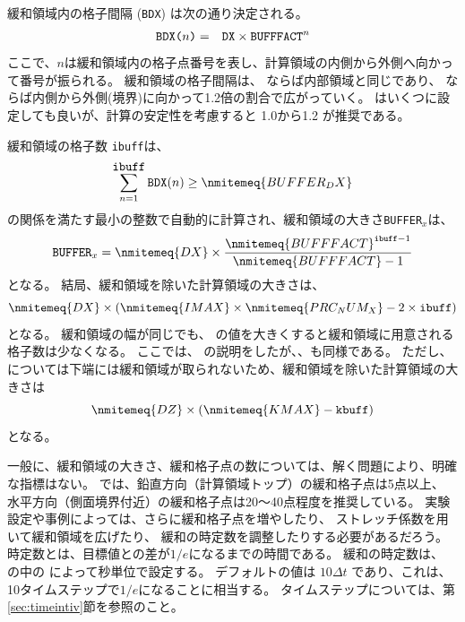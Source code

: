 緩和領域内の格子間隔 (\verb|BDX|) は次の通り決定される。
\begin{eqnarray}
 \verb|BDX(|n\verb|)| &=& \verb|DX| \times \verb|BUFFFACT|^n \nonumber
\end{eqnarray}
ここで、$n$は緩和領域内の格子点番号を表し、計算領域の内側から外側へ向かって番号が振られる。
緩和領域の格子間隔は、
ならば内部領域と同じであり、
ならば内側から外側(境界)に向かって1.2倍の割合で広がっていく。
はいくつに設定しても良いが、計算の安定性を考慮すると 1.0から1.2 が推奨である。

緩和領域の格子数 \verb|ibuff|は、
\begin{eqnarray}
\sum_{n=1}^{\verb|ibuff|} \verb|BDX|(n) \ge \nmitemeq{BUFFER_DX} \nonumber
\end{eqnarray}
の関係を満たす最小の整数で自動的に計算され、緩和領域の大きさ\verb|BUFFER|$_x$は、
\[
  \verb|BUFFER|_x = \nmitemeq{DX} \times \frac{ \nmitemeq{BUFFFACT}^{\texttt{\detokenize{ibuff}}-1 }}{ \nmitemeq{BUFFFACT}-1 }
\]
となる。
結局、緩和領域を除いた計算領域の大きさは、
\[
\nmitemeq{DX} \times ( \nmitemeq{IMAX} \times \nmitemeq{PRC_NUM_X} - 2 \times \verb|ibuff| )
\]
となる。
%
緩和領域の幅が同じでも、
の値を大きくすると緩和領域に用意される格子数は少なくなる。
ここでは、{\XDIR} の説明をしたが、{\YDIR}、{\ZDIR}も同様である。
ただし、{\ZDIR} については下端には緩和領域が取られないため、緩和領域を除いた計算領域の大きさは
\[
\nmitemeq{DZ} \times ( \nmitemeq{KMAX} - \verb|kbuff| )
\]
となる。



一般に、緩和領域の大きさ、緩和格子点の数については、解く問題により、明確な指標はない。
\scalerm では、鉛直方向（計算領域トップ）の緩和格子点は5点以上、
水平方向（側面境界付近）の緩和格子点は20〜40点程度を推奨している。
実験設定や事例によっては、さらに緩和格子点を増やしたり、
ストレッチ係数を用いて緩和領域を広げたり、
緩和の時定数を調整したりする必要があるだろう。
時定数とは、目標値との差が$1/e$になるまでの時間である。
緩和の時定数は、
の中の
によって秒単位で設定する。
デフォルトの値は $10 \Delta t$ であり、これは、10タイムステップで$1/e$になることに相当する。
タイムステップについては、第\ref{sec:timeintiv}節を参照のこと。


